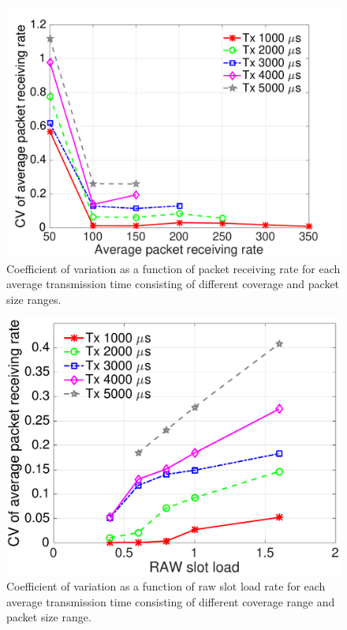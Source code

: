 \begin{figure}[t]
  \centering
   \includegraphics[width=0.75\columnwidth]{figures/new_load_avg_result_Prate_tx.pdf}
    \caption{Coefficient of variation as a function of packet receiving rate for each average transmission time consisting of different coverage and packet size ranges. \label{fig:tx-diff-Prate}}
\end{figure}


\begin{figure}[t]
  \centering
   \includegraphics[width=0.75\columnwidth]{figures/result_new_load_cov_fliter.pdf}
    \caption{Coefficient of variation as a function of \gls{raw} slot load rate for each average transmission time consisting of different coverage range and packet size range.
    \label{fig:tx-diff-load}}
\end{figure}





